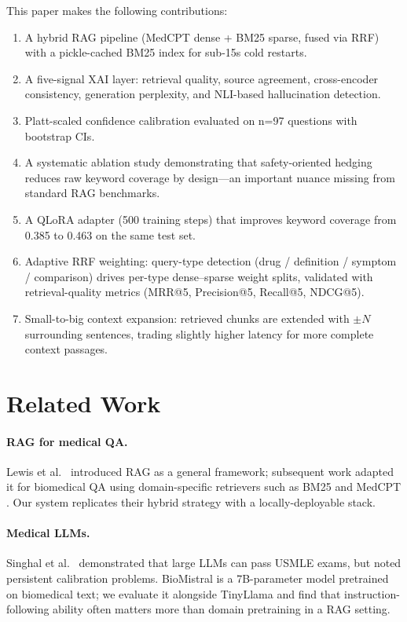 \documentclass[10pt,twocolumn]{article}
\begin{document}
This paper makes the following contributions:
\begin{enumerate}[noitemsep]
  \item A hybrid RAG pipeline (MedCPT dense + BM25 sparse, fused via RRF)
        with a pickle-cached BM25 index for sub-15s cold restarts.
  \item A five-signal XAI layer: retrieval quality, source agreement,
        cross-encoder consistency, generation perplexity, and NLI-based
        hallucination detection.
  \item Platt-scaled confidence calibration evaluated on n=97 questions
        with bootstrap CIs.
  \item A systematic ablation study demonstrating that safety-oriented
        hedging reduces raw keyword coverage by design---an important
        nuance missing from standard RAG benchmarks.
  \item A QLoRA adapter (500 training steps) that improves keyword
        coverage from 0.385 to 0.463 on the same test set.
  \item Adaptive RRF weighting: query-type detection (drug / definition /
        symptom / comparison) drives per-type dense--sparse weight splits,
        validated with retrieval-quality metrics (MRR@5, Precision@5,
        Recall@5, NDCG@5).
  \item Small-to-big context expansion: retrieved chunks are extended with
        $\pm N$ surrounding sentences, trading slightly higher latency for
        more complete context passages.
\end{enumerate}

\section{Related Work}
\label{sec:related}

\paragraph{RAG for medical QA.}
Lewis et al.~\cite{lewis2020rag} introduced RAG as a general framework;
subsequent work adapted it for biomedical QA using domain-specific retrievers
such as BM25 \cite{karpukhin2020dpr} and MedCPT \cite{jin2023medcpt}.
Our system replicates their hybrid strategy with a locally-deployable stack.

\paragraph{Medical LLMs.}
Singhal et al.~\cite{singhal2023large} demonstrated that large LLMs can pass
USMLE exams, but noted persistent calibration problems.
BioMistral \cite{labrak2024biomistral} is a 7B-parameter model pretrained on
biomedical text; we evaluate it alongside TinyLlama \cite{zhang2024tinyllama}
and find that instruction-following ability often matters more than domain
pretraining in a RAG setting.
\end{document}
